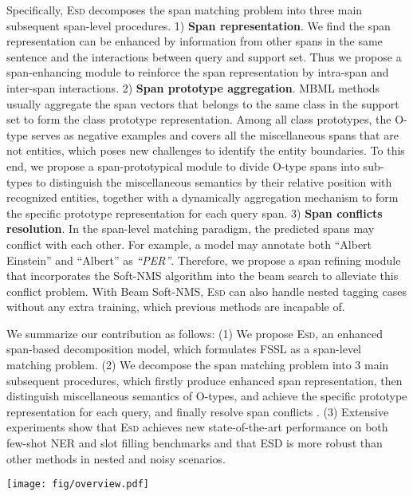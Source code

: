 \documentclass[11pt]{article}
\newcommand{\modelname}{\textsc{Esd}\xspace}
\begin{document}
Specifically, \modelname decomposes the span matching problem into three main subsequent span-level procedures.
1) \textbf{Span representation}. 
We find the span representation can be enhanced by information from other spans in the same sentence and the interactions between query and support set.
Thus we propose a span-enhancing module to reinforce the span representation by intra-span and inter-span interactions.
2) \textbf{Span prototype aggregation}.
MBML methods usually aggregate the span vectors that belongs to the same class in the support set to form the class prototype representation. 
Among all class prototypes, the O-type serves as negative examples and covers all the miscellaneous spans that are not entities, which poses new challenges to identify the entity boundaries.
To this end, we propose a span-prototypical module to divide O-type spans into  sub-types to distinguish the miscellaneous semantics by their relative position with recognized entities, together with a dynamically aggregation mechanism to form the specific prototype representation for each query span.
3) \textbf{Span conflicts resolution}.
In the span-level matching paradigm, the predicted spans may conflict with each other. 
For example, a model may annotate both ``Albert Einstein'' and ``Albert'' as \textit{``PER''}.
Therefore, we propose a span refining module that incorporates the Soft-NMS \cite{soft-NMS,SoftNMS-NER} algorithm into the beam search to alleviate this conflict problem.
With Beam Soft-NMS, \modelname can also handle nested tagging cases without any extra training, which previous methods are incapable of.                

We summarize our contribution as follows: 
(1) We propose \modelname, an enhanced span-based decomposition model, which formulates FSSL as a span-level matching problem. 
(2) We decompose the span matching problem into 3 main subsequent procedures, which firstly produce enhanced span representation, then distinguish miscellaneous semantics of O-types, and achieve the specific prototype representation for each query, and finally resolve span conflicts . 
(3) Extensive experiments show that \modelname achieves new state-of-the-art performance on both few-shot NER and slot filling benchmarks and that ESD is more robust than other methods in nested and noisy scenarios.

\begin{figure*}[h]
    \centering
    \texttt{[image: fig/overview.pdf]}
    \caption{The architecture ( span modules) of \modelname with a -way ({`PER'} and {`ORG'}) -shot input task. We only list spans with lengths less than  for clarity. \modelname assigns label {`PER'} to the span {``Albert Einstein''} and {`O'} to the other spans in query  based on the support set . 
}
    \label{fig:overview}
\end{figure*}
\end{document}

